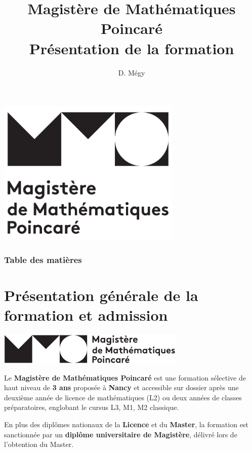 \documentclass[slidetop,11pt]{beamer}
\title{Magistère de Mathématiques Poincaré\\ Présentation de la formation}
\author{D. Mégy}
\begin{document}
  

\begin{frame}
\begin{center}
\includegraphics[height=7cm]{images/Logo-MMP-noir-cropped}
\end{center}
\end{frame}  

\begin{frame}
\frametitle{Table des matières}
\tableofcontents
\end{frame}

\section{Présentation générale de la formation et admission}

\begin{frame}
\begin{center}
\includegraphics[height=1.5cm]{images/Logo-MMP-noir-2}
\end{center}
Le \textbf{Magistère de Mathématiques Poincaré} est une formation sélective de haut niveau de \textbf{3 ans} proposée à \textbf{Nancy} et accessible sur dossier après une deuxième année de licence de mathématiques (L2) ou deux années de classes préparatoires, englobant le cursus L3, M1, M2 classique.
\bigskip

En plus des diplômes nationaux de la \textbf{Licence} et du \textbf{Master}, la formation est sanctionnée par un \textbf{diplôme universitaire de Magistère}, délivré lors de l'obtention du Master.
\end{frame}
\end{document}
